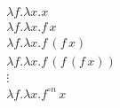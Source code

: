 \documentclass{article}
\begin{document}
\begin{gather*}
\lambda f.\lambda x.x \\
\lambda f.\lambda x.f\, x \\
\lambda f.\lambda x.f\, (f\, x) \\
\lambda f.\lambda x.f\, (f\, (f\, x)) \\
\vdots \\
\lambda f.\lambda x.f^{\circ n}\, x
\end{gather*}
\end{document}

